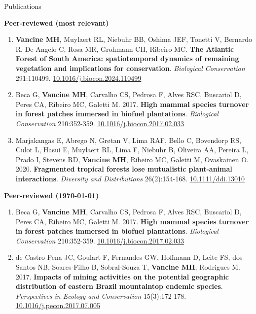 \documentclass{resume}
\begin{document}

\begin{rSection}{Publications}

{\bf Peer-reviewed (most relevant)}

\begin{enumerate} 

\item {\bf Vancine MH}, Muylaert RL, Niebuhr BB, Oshima JEF, Tonetti V, Bernardo R, De Angelo C, Rosa MR, Grohmann CH, Ribeiro MC. {\bf The Atlantic Forest of South America: spatiotemporal dynamics of remaining vegetation and implications for conservation}. {\it Biological Conservation} 291:110499. \href{https://doi.org/10.1016/j.biocon.2024.110499}{\underline{10.1016/j.biocon.2024.110499}}

\item Beca G, {\bf Vancine MH}, Carvalho CS, Pedrosa F, Alves RSC, Buscariol D, Peres CA, Ribeiro MC, Galetti M. 2017. {\bf High mammal species turnover in forest patches immersed in biofuel plantations}. {\it Biological Conservation} 210:352-359. \href{https://doi.org/10.1016/j.biocon.2017.02.033}{\underline{10.1016/j.biocon.2017.02.033}}

\item Marjakangas E, Abrego N, Grøtan V, Lima RAF, Bello C, Bovendorp RS, Culot L, Hasui E, Muylaert RL, Lima F, Niebuhr B, Oliveira AA, Pereira L, Prado I, Stevens RD, {\bf Vancine MH}, Ribeiro MC, Galetti M, Ovaskainen O. 2020. {\bf Fragmented tropical forests lose mutualistic plant-animal interactions}. {\it Diversity and Distributions} 26(2):154-168. \href{https://doi.org/10.1111/ddi.13010}{\underline{10.1111/ddi.13010}}

\end{enumerate} 

{\bf Peer-reviewed (\today)}

\begin{enumerate} 
\item Beca G, {\bf Vancine MH}, Carvalho CS, Pedrosa F, Alves RSC, Buscariol D, Peres CA, Ribeiro MC, Galetti M. 2017. {\bf High mammal species turnover in forest patches immersed in biofuel plantations}. {\it Biological Conservation} 210:352-359. \href{https://doi.org/10.1016/j.biocon.2017.02.033}{\underline{10.1016/j.biocon.2017.02.033}}

\item de Castro Pena JC, Goulart F, Fernandes GW, Hoffmann D, Leite FS, dos Santos NB, Soares-Filho B, Sobral-Souza T, {\bf Vancine MH}, Rodrigues M. 2017. {\bf Impacts of mining activities on the potential geographic distribution of eastern Brazil mountaintop endemic species}. {\it Perspectives in Ecology and Conservation} 15(3):172-178. \href{https://doi.org/10.1016/j.pecon.2017.07.005}{\underline{10.1016/j.pecon.2017.07.005}}


\end{enumerate}
\end{rSection}
\end{document}
